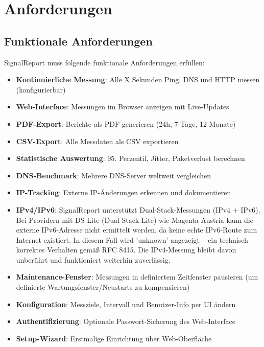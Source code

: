 \section{Anforderungen}
\label{sec:anforderungen}

\subsection{Funktionale Anforderungen}
SignalReport muss folgende funktionale Anforderungen erfüllen:

\begin{itemize}
    \item \textbf{Kontinuierliche Messung}: Alle X Sekunden Ping, DNS und HTTP messen (konfigurierbar)
    \item \textbf{Web-Interface}: Messungen im Browser anzeigen mit Live-Updates
    \item \textbf{PDF-Export}: Berichte als PDF generieren (24h, 7 Tage, 12 Monate)
    \item \textbf{CSV-Export}: Alle Messdaten als CSV exportieren
    \item \textbf{Statistische Auswertung}: 95. Perzentil, Jitter, Paketverlust berechnen
    \item \textbf{DNS-Benchmark}: Mehrere DNS-Server weltweit vergleichen
    \item \textbf{IP-Tracking}: Externe IP-Änderungen erkennen und dokumentieren
    \item \textbf{IPv4/IPv6}: SignalReport unterstützt Dual-Stack-Messungen (IPv4 + IPv6). Bei Providern mit DS-Lite (Dual-Stack Lite) wie Magenta-Austria kann die externe IPv6-Adresse nicht ermittelt werden, da keine echte IPv6-Route zum Internet existiert. In diesem Fall wird 'unknown' angezeigt – ein technisch korrektes Verhalten gemäß RFC 8415. Die IPv4-Messung bleibt davon unberührt und funktioniert weiterhin zuverlässig.
    \item \textbf{Maintenance-Fenster}: Messungen in definiertem Zeitfenster pausieren (um definierte Wartungsfenster/Neustarts zu kompensieren)
    \item \textbf{Konfiguration}: Messziele, Intervall und Benutzer-Info per UI ändern
    \item \textbf{Authentifizierung}: Optionale Passwort-Sicherung des Web-Interface
    \item \textbf{Setup-Wizard}: Erstmalige Einrichtung über Web-Oberfläche
\end{itemize}

